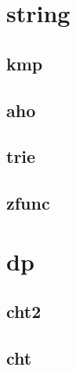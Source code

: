 \section{string}
\vspace{-2pt}
\subsection{kmp}
\vspace{-5pt}
\raggedbottom
\hrulefill

\vspace{-2pt}
\subsection{aho}
\vspace{-5pt}
\raggedbottom
\hrulefill

\vspace{-2pt}
\subsection{trie}
\vspace{-5pt}
\raggedbottom
\hrulefill

\vspace{-2pt}
\subsection{zfunc}
\vspace{-5pt}
\raggedbottom
\hrulefill


\section{dp}
\vspace{-2pt}
\subsection{cht2}
\vspace{-5pt}
\raggedbottom
\hrulefill

\vspace{-2pt}
\subsection{cht}
\vspace{-5pt}
\raggedbottom
\hrulefill

